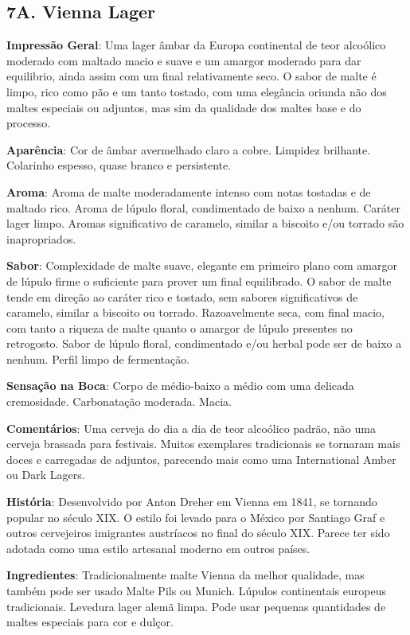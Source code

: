 \subsection*{7A. Vienna Lager}
\textbf{Impressão Geral}: Uma lager âmbar da Europa continental de teor alcoólico moderado com maltado macio e suave e um amargor moderado para dar equilibrio, ainda assim com um final relativamente seco. O sabor de malte é limpo, rico como pão e um tanto tostado, com uma elegância oriunda não dos maltes especiais ou adjuntos, mas sim da qualidade dos maltes base e do processo.

\textbf{Aparência}: Cor de âmbar avermelhado claro a cobre. Limpidez brilhante. Colarinho espesso, quase branco e persistente.

\textbf{Aroma}: Aroma de malte moderadamente intenso com notas tostadas e de maltado rico. Aroma de lúpulo floral, condimentado de baixo a nenhum. Caráter lager limpo. Aromas significativo de caramelo, similar a biscoito e/ou torrado são inapropriados.

\textbf{Sabor}: Complexidade de malte suave, elegante em primeiro plano com amargor de lúpulo firme o suficiente para prover um final equilibrado. O sabor de malte tende em direção ao caráter rico e tostado, sem sabores significativos de caramelo, similar a biscoito ou torrado. Razoavelmente seca, com final macio, com tanto a riqueza de malte quanto o amargor de lúpulo presentes no retrogosto. Sabor de lúpulo floral, condimentado e/ou herbal pode ser de baixo a nenhum. Perfil limpo de fermentação.

\textbf{Sensação na Boca}: Corpo de médio-baixo a médio com uma delicada cremosidade. Carbonatação moderada. Macia.

\textbf{Comentários}: Uma cerveja do dia a dia de teor alcoólico padrão, não uma cerveja brassada para festivais. Muitos exemplares tradicionais se tornaram mais doces e carregadas de adjuntos, parecendo mais como uma International Amber ou Dark Lagers.

\textbf{História}: Desenvolvido por Anton Dreher em Vienna em 1841, se tornando popular no século XIX. O estilo foi levado para o México por Santiago Graf e outros cervejeiros imigrantes austríacos no final do século XIX. Parece ter sido adotada como uma estilo artesanal moderno em outros países.

\textbf{Ingredientes}: Tradicionalmente malte Vienna da melhor qualidade, mas também pode ser usado Malte Pils ou Munich. Lúpulos continentais europeus tradicionais. Levedura lager alemã limpa. Pode usar pequenas quantidades de maltes especiais para cor e dulçor.

